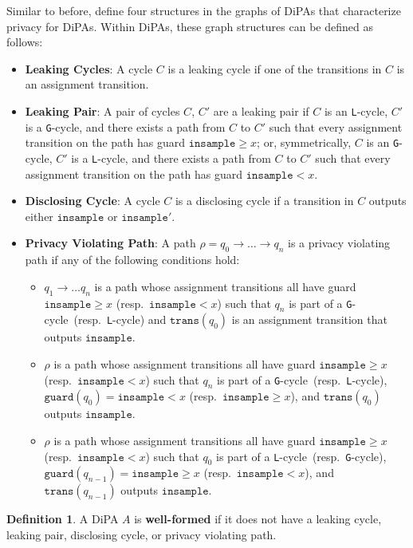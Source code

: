 \documentclass[12pt]{article}
\newcommand{\gguard}[1][x]{\texttt{insample}\geq #1}
\newcommand{\lguard}[1][x]{\texttt{insample} < #1}
\newcommand{\guard}{\texttt{guard}}
\newcommand{\trans}{\texttt{trans}}
\newcommand{\gcycle}{\texttt{G}-cycle}
\newcommand{\lcycle}{\texttt{L}-cycle}
\theoremstyle{definition}
\newtheorem{defn}[thm]{Definition}
\begin{document}
Similar to before, \cite{chadhaLinearTimeDecidability2021} define four structures in the graphs of DiPAs that characterize privacy for DiPAs. Within DiPAs, these graph structures can be defined as follows:\begin{itemize}
    \item \textbf{Leaking Cycles}: A cycle $C$ is a leaking cycle if one of the transitions in $C$ is an assignment transition.
    \item \textbf{Leaking Pair}: A pair of cycles $C$, $C'$ are a leaking pair if $C$ is an \lcycle, $C'$ is a \gcycle, and there exists a path from $C$ to $C'$ such that every assignment transition on the path has guard $\gguard$; or, symmetrically, $C$ is an \gcycle, $C'$ is a \lcycle, and there exists a path from $C$ to $C'$ such that every assignment transition on the path has guard $\lguard$.
    \item \textbf{Disclosing Cycle}: A cycle $C$ is a disclosing cycle if a transition in $C$ outputs either $\texttt{insample}$ or $\texttt{insample}'$. 
    \item \textbf{Privacy Violating Path}: A path $\rho = q_0\to\ldots \to q_n$ is a privacy violating path if any of the following conditions hold:\begin{itemize}
        \item $q_1\to\ldots q_n$ is a path whose assignment transitions all have guard $\gguard$ (resp.\ $\lguard$) such that $q_n$ is part of a \gcycle\ (resp.\ \lcycle) and $\trans(q_0)$ is an assignment transition that outputs $\texttt{insample}$. 
        \item $\rho$ is a path whose assignment transitions all have guard $\gguard$ (resp.\ $\lguard$) such that $q_n$ is part of a \gcycle\ (resp.\ \lcycle), $\guard(q_0) = \lguard$ (resp.\ $\gguard$), and $\trans(q_0)$ outputs $\texttt{insample}$.
        \item $\rho$ is a path whose assignment transitions all have guard $\gguard$ (resp.\ $\lguard$) such that $q_0$ is part of a \lcycle\ (resp.\ \gcycle), $\guard(q_{n-1}) = \gguard$ (resp.\ $\lguard$), and $\trans(q_{n-1})$ outputs $\texttt{insample}$.
    \end{itemize}
\end{itemize}



\begin{defn}
    A DiPA $A$ is \textbf{well-formed} if it does not have a leaking cycle, leaking pair, disclosing cycle, or privacy violating path. 
\end{defn}
\end{document}
